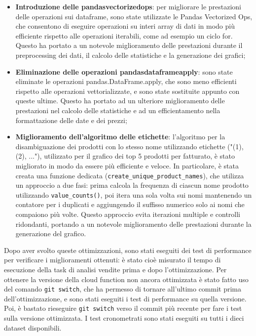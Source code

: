 \begin{itemize}
    \item \textbf{Introduzione delle \gls{pandasvectorizedops}}: per migliorare le prestazioni delle operazioni sui dataframe, sono state utilizzate le Pandas Vectorized Ops, che consentono di eseguire operazioni su interi array di dati in modo più efficiente rispetto alle operazioni iterabili, come ad esempio un ciclo for. Questo ha portato a un notevole miglioramento delle prestazioni durante il preprocessing dei dati, il calcolo delle statistiche e la generazione dei grafici;
    \item \textbf{Eliminazione delle operazioni \gls{pandasdataframeapply}}: sono state eliminate le operazioni pandas.DataFrame.apply, che sono meno efficienti rispetto alle operazioni vettorializzate, e sono state sostituite appunto con queste ultime. Questo ha portato ad un ulteriore miglioramento delle prestazioni nel calcolo delle statistiche e ad un efficientamento nella formattazione delle date e dei prezzi;
    \item \textbf{Miglioramento dell'algoritmo delle etichette}: l'algoritmo per la disambiguazione dei prodotti con lo stesso nome utilizzando etichette ("(1), (2), ..."), utilizzato per il grafico dei top 5 prodotti per fatturato, è stato migliorato in modo da essere più efficiente e veloce. In particolare, è stata creata una funzione dedicata (\texttt{create\_unique\_product\_names}), che utilizza un approccio a due fasi: prima calcola la frequenza di ciascun nome prodotto utilizzando \texttt{value\_counts()}, poi itera una sola volta sui nomi mantenendo un contatore per i duplicati e aggiungendo il suffisso numerico solo ai nomi che compaiono più volte. Questo approccio evita iterazioni multiple e controlli ridondanti, portando a un notevole miglioramento delle prestazioni durante la generazione del grafico.
\end{itemize}

Dopo aver svolto queste ottimizzazioni, sono stati eseguiti dei test di performance per verificare i miglioramenti ottenuti: è stato cioè misurato il tempo di esecuzione della task di analisi vendite prima e dopo l'ottimizzazione. Per ottenere la versione della cloud function non ancora ottimizzata è stato fatto uso del comando \texttt{git switch}, che ha permesso di tornare all'ultimo commit prima dell'ottimizzazione, e sono stati eseguiti i test di performance su quella versione. Poi, è bastato rieseguire \texttt{git switch} verso il commit più recente per fare i test sulla versione ottimizzata. I test cronometrati sono stati eseguiti su tutti i dieci dataset disponibili.

